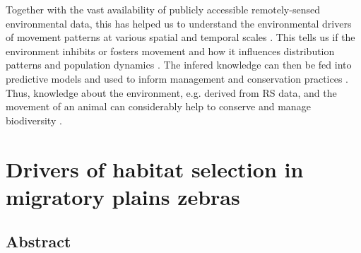 \documentclass[12pt,a4paper, twoside, english]{article}
\begin{document}
Together with the vast availability of publicly accessible remotely-sensed environmental data, this has helped us to understand the environmental drivers of movement patterns at various spatial and temporal scales \citep{Neumann2015a, Trierweiler2013, Pettorelli2014}. This tells us if the environment inhibits or fosters movement \citep{Fahrig2007, Beyer2016} and how it influences distribution patterns and population dynamics \citep{Trierweiler2013}. The infered knowledge can then be fed into predictive models and used to inform management and conservation practices \citep{Avgar2013}. Thus, knowledge about the environment, e.g. derived from RS data, and the movement of an animal can considerably help to conserve and manage biodiversity \citep{Barton2015, Neumann2015a, DeKnegt2011, Driscoll2014}.

\newpage
\section{Drivers of habitat selection in migratory plains zebras}


\subsection{Abstract}

\end{document}
